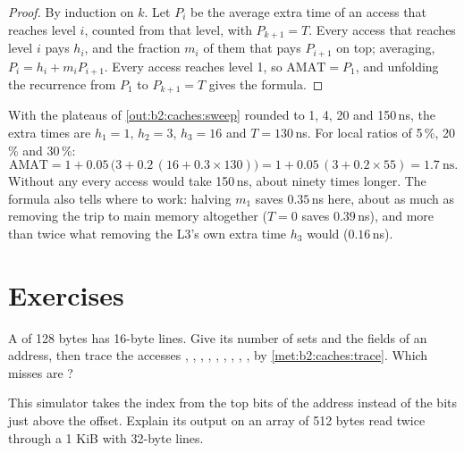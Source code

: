 \begin{proof}
By induction on $k$. Let $P_i$ be the average extra time of an access that reaches level $i$, counted from that
level, with $P_{k+1} = T$. Every access that reaches level $i$ pays $h_i$, and the fraction $m_i$ of them that 
pays $P_{i+1}$ on top; averaging, $P_i = h_i + m_i P_{i+1}$. Every access reaches level 1, so $\mathrm{AMAT} = P_1$,
and unfolding the recurrence from $P_1$ to $P_{k+1} = T$ gives the formula.
\end{proof}

With the plateaus of \cref{out:b2:caches:sweep} rounded to 1, 4, 20 and 150\,ns, the extra times are $h_1 = 1$,
$h_2 = 3$, $h_3 = 16$ and $T = 130$\,ns. For local  ratios of 5\,\%, 20\,\% and 30\,\%:
\[
\mathrm{AMAT} = 1 + 0.05\,\bigl(3 + 0.2\,(16 + 0.3 \times 130)\bigr) = 1 + 0.05\,(3 + 0.2 \times 55) = 1.7\ \text{ns}.
\]
Without any  every access would take 150\,ns, about ninety times longer. The formula also tells where to work:
halving $m_1$ saves $0.35$\,ns here, about as much as removing the trip to main memory altogether ($T = 0$ saves
$0.39$\,ns), and more than twice what removing the L3's own extra time $h_3$ would ($0.16$\,ns).

\section{Exercises}\label{sec:b2:caches:exercises}

\begin{exercise}[$\star$]\label{exo:b2:caches:1}
A  of 128 bytes has 16-byte lines. Give its number of sets and the fields of an address, then
trace the accesses , , , , , , ,
, ,  by \cref{met:b2:caches:trace}. Which misses are ?
\end{exercise}

\begin{exercise}[$\star$]\label{exo:b2:caches:2}
This simulator takes the index from the top bits of the address instead of the bits just above the offset. Explain
its output on an array of 512 bytes read twice through a 1 KiB  with 32-byte lines.
\end{exercise}

